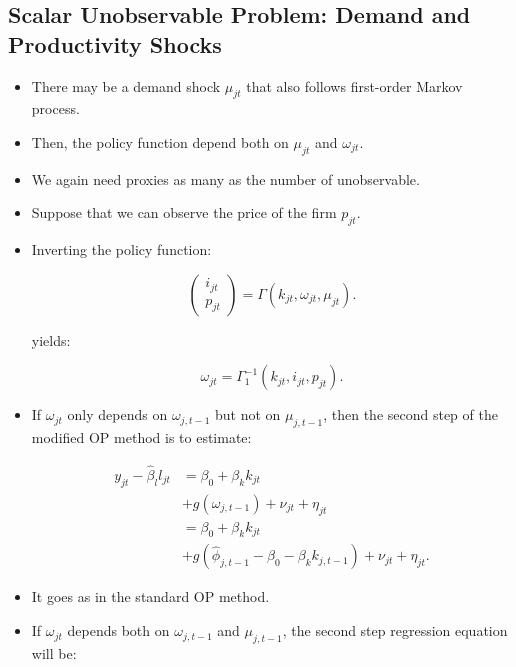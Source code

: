 \documentclass[]{book}
\providecommand{\tightlist}{%
  \setlength{\itemsep}{0pt}\setlength{\parskip}{0pt}}
\theoremstyle{definition}
\theoremstyle{definition}
\theoremstyle{definition}
\theoremstyle{remark}
\begin{document}
\subsection{Scalar Unobservable Problem: Demand and Productivity
Shocks}\label{scalar-unobservable-problem-demand-and-productivity-shocks}

\begin{itemize}
\tightlist
\item
  There may be a demand shock \(\mu_{jt}\) that also follows first-order
  Markov process.
\item
  Then, the policy function depend both on \(\mu_{jt}\) and
  \(\omega_{jt}\).
\item
  We again need proxies as many as the number of unobservable.
\item
  Suppose that we can observe the price of the firm \(p_{jt}\).
\item
  Inverting the policy function:

  \begin{equation}
  \begin{pmatrix}
  i_{jt}\\ p_{jt}
  \end{pmatrix}
  = \Gamma(k_{jt}, \omega_{jt}, \mu_{jt}).
  \end{equation}

  yields:

  \begin{equation}
  \omega_{jt} = \Gamma_1^{- 1}(k_{jt}, i_{jt}, p_{jt}).
  \end{equation}
\item
  If \(\omega_{jt}\) only depends on \(\omega_{j, t - 1}\) but not on
  \(\mu_{j, t - 1}\), then the second step of the modified OP method is
  to estimate:

  \begin{equation}
  \begin{split}
  y_{jt} - \hat{\beta}_l l_{jt} 
  &= \beta_0 + \beta_k k_{jt}\\
  & + g(\omega_{j, t - 1}) + \nu_{jt} + \eta_{jt}\\
  &= \beta_0 + \beta_k k_{jt}\\
  & + g(\hat{\phi}_{j, t - 1} - \beta_0 - \beta_k k_{j, t - 1}) + \nu_{jt} + \eta_{jt}.
  \end{split}
  \end{equation}
\item
  It goes as in the standard OP method.
\item
  If \(\omega_{jt}\) depends both on \(\omega_{j, t - 1}\) and
  \(\mu_{j, t - 1}\), the second step regression equation will be:


\end{itemize}
\end{document}
